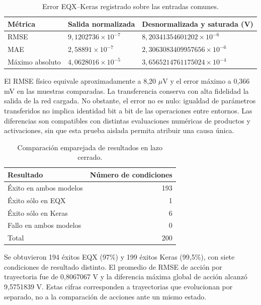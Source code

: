 \begin{table}[H]\centering\small
\caption{Error EQX--Keras registrado sobre las entradas comunes.}\label{tab:cap2_equivalencia}
\begin{tabularx}{\linewidth}{lYY}\toprule
Métrica & Salida normalizada & Desnormalizada y saturada (V)\\\midrule
RMSE & $9{,}1202736\times10^{-7}$ & $8{,}20341354601202\times10^{-6}$\\
MAE & $2{,}58891\times10^{-7}$ & $2{,}3063083409957656\times10^{-6}$\\
Máximo absoluto & $4{,}0628016\times10^{-5}$ & $3{,}6565214761175024\times10^{-4}$\\\bottomrule
\end{tabularx}
\end{table}
El RMSE físico equivale aproximadamente a 8,20 $\mu$V y el error máximo a 0,366 mV en las muestras comparadas. La transferencia conserva con alta fidelidad la salida de la red cargada. No obstante, el error no es nulo: igualdad de parámetros transferidos no implica identidad bit a bit de las operaciones entre entornos. Las diferencias son compatibles con distintas evaluaciones numéricas de productos y activaciones, sin que esta prueba aislada permita atribuir una causa única.





\begin{table}[H]\centering\small
\caption{Comparación emparejada de resultados en lazo cerrado.}\label{tab:cap2_pareado}
\begin{tabularx}{\linewidth}{Yr}\toprule
Resultado & Número de condiciones\\\midrule
Éxito en ambos modelos & 193\\
Éxito sólo en EQX & 1\\
Éxito sólo en Keras & 6\\
Fallo en ambos modelos & 0\\\midrule
Total & 200\\\bottomrule
\end{tabularx}
\end{table}
Se obtuvieron 194 éxitos EQX (97\%) y 199 éxitos Keras (99,5\%), con siete condiciones de resultado distinto. El promedio de RMSE de acción por trayectoria fue de 0,8067067 V y la diferencia máxima global de acción alcanzó 9,5751839 V. Estas cifras corresponden a trayectorias que evolucionan por separado, no a la comparación de acciones ante un mismo estado.

